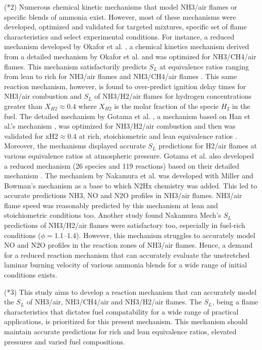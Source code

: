 \documentclass[10pt,twocolumn]{icfd2026paper}
\begin{document}
(*2) Numerous chemical kinetic mechanisms that model NH3/air flames or specific blends of ammonia exist. However, most of these mechanisms were developed, optimized and validated for targeted mixtures, specific set of flame characteristics and select experimental conditions. For instance, a reduced mechanism developed by Okafor et al. \cite{okaforMeasurement2019}, a chemical kinetics mechanism derived from a detailed mechanism by Okafor et al. \cite{okaforExperimental2018} and was optimized for NH3/CH4/air flames. This mechanism satisfactorily predicts $S_L$ at equivalence ratios ranging from lean to rich for NH3/air flames \cite{okaforMeasurement2019, meiExperimental2019} and NH3/CH4/air flames \cite{okaforMeasurement2019, chaiReview2021}. This same reaction mechanism, however, is found to over-predict ignition delay times for NH3/air combustion \cite{liChemical2019} and $S_L$ of NH3/H2/air flames for hydrogen concentrations greater than $X_{H2}\approx0.4$ where $X_{H2}$ is the molar fraction of the specie $H_2$ in the fuel. The detailed mechanism by Gotama et al. \cite{gotamaMeasurement2022}, a mechanism based on Han et al.'s mechanism \cite{hanExperimental2020}, was optimized for NH3/H2/air combustion and then was validated for xH2$\approx0.4$ at rich, stoichiometric and lean equivalence ratios \cite{gotamaMeasurement2022}. Moreover, the mechanisms displayed accurate $S_L$ predictions for H2/air flames at various equivalence ratios at atmospheric pressure. Gotama et al. also developed a reduced mechanism (26 species and 119 reactions) based on their detailed mechanism \cite{gotamaMeasurement2022}. The mechanism by Nakamura et al. \cite{nakamuraKinetic2017} was developed with Miller and Bowman's mechanism \cite{millerMechanism1989} as a base to which N2Hx chemistry was added. This led to accurate predictions NH3, NO and N2O profiles in NH3/air flames. NH3/air flame speed was reasonably predicted by this mechanism at lean and stoichiometric conditions \cite{meiExperimental2019} too. Another study found Nakamura Mech's $S_L$ predictions of NH3/H2/air flames were satisfactory too, especially in fuel-rich conditions ($\phi=$1.1--1.4). However, this mechanism struggles to accurately model NO and N2O profiles in the reaction zones of NH3/air flames. Hence, a demand for a reduced reaction mechanism that can accurately evaluate the unstretched laminar burning velocity of various ammonia blends for a wide range of initial conditions exists.

(*3) This study aims to develop a reaction mechanism that can accurately model the $S_L$ of NH3/air, NH3/CH4/air and NH3/H2/air flames. The $S_L$, being a flame characteristics that dictates fuel compatability for a wide range of practical applications, is prioritized for this present mechanism. This mechanism should maintain accurate predictions for rich and lean equivalence ratios, elevated pressures and varied fuel compositions.
\end{document}
